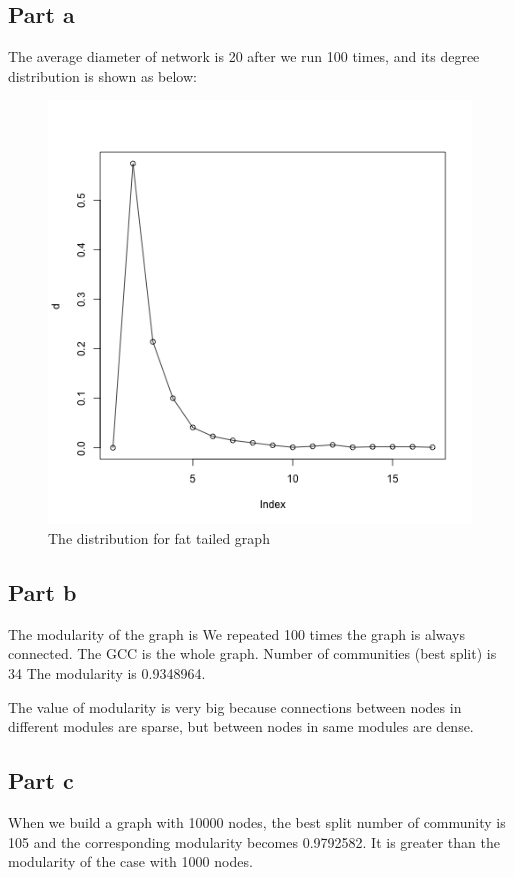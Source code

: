 \documentclass{article}
\begin{document}
\subsection{Part a}
The average diameter of network is 20 after we run 100 times, and its degree distribution is shown as below:
\begin{figure}[htbp]
\centering
\includegraphics[width=.6\textwidth]{p2_1.png}
\caption{The distribution for fat tailed graph}
\label{fig:sp_hist}
\end{figure}

\subsection{Part b}
The modularity of the graph is 
We repeated 100 times the graph is always connected.
The GCC is the whole graph.
Number of communities (best split) is 34
The modularity is 0.9348964.

The value of modularity is very big because connections between nodes in different modules are sparse, but between nodes in same modules are dense. 
\subsection{Part c}
When we build a graph with 10000 nodes, the best split number of community is 105 and the corresponding modularity becomes 0.9792582.
It is greater than the modularity of the case with 1000 nodes.
\end{document}
